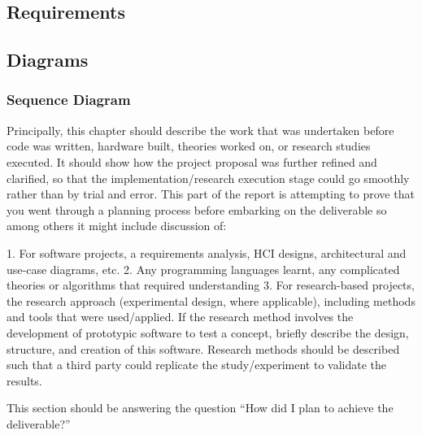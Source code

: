 \subsection{Requirements}
\subsection{Diagrams}
\subsubsection{Sequence Diagram}


Principally, this chapter should describe the work that was undertaken before
code was written, hardware built, theories worked on, or research studies
executed. It should show how the project proposal was further refined and
clarified, so that the implementation/research execution stage could go
smoothly rather than by trial and error. This part of the report is attempting to
prove that you went through a planning process before embarking on the
deliverable so among others it might include discussion of:

1. For software projects, a requirements analysis, HCI designs, architectural
and use-case diagrams, etc.
2. Any programming languages learnt, any complicated theories or algorithms
that required understanding
3. For research-based projects, the research approach (experimental design,
where applicable), including methods and tools that were used/applied. If the
research method involves the development of prototypic software to test a
concept, briefly describe the design, structure, and creation of this software.
Research methods should be described such that a third party could replicate
the study/experiment to validate the results.

This section should be answering the question “How did I plan to achieve the
deliverable?”
